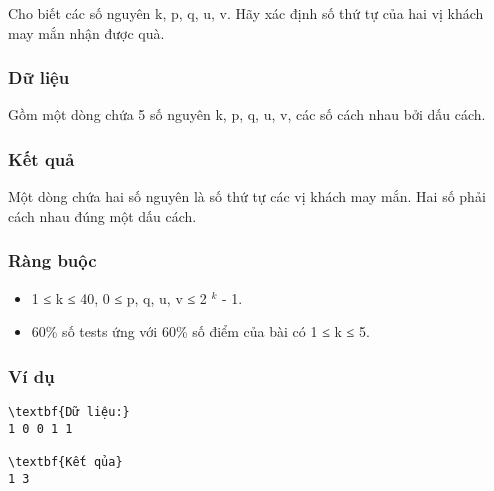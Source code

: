Cho biết các số nguyên k, p, q, u, v. Hãy xác định số thứ tự của hai vị khách may mắn nhận được quà.

\subsubsection{Dữ liệu}

Gồm một dòng chứa 5 số nguyên k, p, q, u, v, các số cách nhau bởi dấu cách.

\subsubsection{Kết quả}

Một dòng chứa hai số nguyên là số thứ tự các vị khách may mắn. Hai số phải cách nhau đúng một dấu cách.

\subsubsection{Ràng buộc}
\begin{itemize}
	\item 1 ≤ k ≤ 40, 0 ≤ p, q, u, v ≤ 2 $^ k $ - 1.
	\item 60\% số tests ứng với 60\% số điểm của bài có 1 ≤ k ≤ 5.
\end{itemize}

\subsubsection{Ví dụ}
\begin{verbatim}
\textbf{Dữ liệu:}
1 0 0 1 1

\textbf{Kết qủa}
1 3
\end{verbatim}